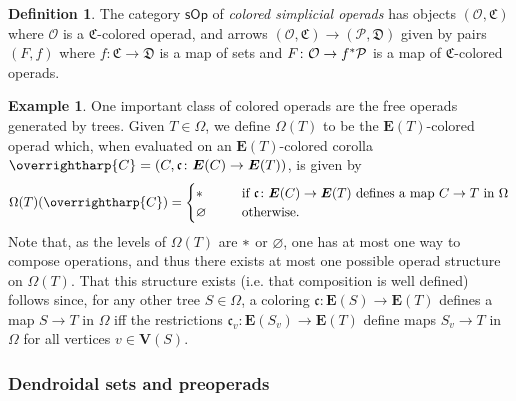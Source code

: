 \documentclass[a4paper,10pt
,draft
]{article}%
\numberwithin{equation}{section}
\numberwithin{figure}{section}
\theoremstyle{definition} %
\newtheorem{definition}[equation]{Definition}%
\newtheorem{example}[equation]{Example}%
\newcommand{\vect}[1]{\text{\overrightharp{\ensuremath{#1}}}}
\newcommand{\sOp}{\ensuremath{\mathsf{sOp}}}%
\renewcommand{\O}{\ensuremath{\mathcal O}}
\renewcommand{\P}{\ensuremath{\mathcal P}}
\newcommand{\1}{\ensuremath{\mathbbm 1}}%
\begin{document}
\begin{definition}
        The category $\sOp$ of \textit{colored simplicial operads}
        has objects $(\O, \mathfrak C)$ where $\O$ is a $\mathfrak C$-colored operad,
        and arrows $(\O, \mathfrak C) \to (\P, \mathfrak D)$ given by pairs $(F,f)$
        where $f \colon \mathfrak C \to \mathfrak D$ is a map of sets and
        $F \colon \O \to f^{\**}\P$ is a map of $\mathfrak C$-colored operads.
\end{definition}


\begin{example}
        One important class of colored operads are the free operads generated by trees.
        Given $T \in \Omega$, we define $\Omega(T)$ to be the $\boldsymbol{E}(T)$-colored operad which,
        when evaluated on an $\boldsymbol{E}(T)$-colored corolla
        $\vect C = (C, \mathfrak c \colon \boldsymbol{E}(C) \to \boldsymbol{E}(T))$, is given by
        \begin{equation}\label{OMEGADEF_EQ}
                \Omega(T)(\vect C) =
                \begin{cases}
                        \** \qquad & 
                        \mbox{if
                          $\mathfrak{c} \colon \boldsymbol{E}(C) \to \boldsymbol{E}(T)$
                          defines a map $C \to T$ in $\Omega$}
                        \\
                        \varnothing & \text{otherwise.}
                \end{cases}
        \end{equation}
        Note that, as the levels of $\Omega(T)$ are $\**$ or $\varnothing$,
        one has at most one way to compose operations,
        and thus there exists at most one possible operad structure on $\Omega(T)$.
        That this structure exists
        (i.e. that composition is well defined)
        follows since,
        for any other tree $S \in \Omega$,
        a coloring
        $\mathfrak{c} \colon \boldsymbol{E}(S) \to \boldsymbol{E}(T)$
        defines a map
        $S \to T$ in $\Omega$
        iff
        the restrictions
        $\mathfrak{c}_v \colon \boldsymbol{E}(S_v) \to \boldsymbol{E}(T)$
        define maps
        $S_v \to T$ in $\Omega$
        for all vertices $v \in \boldsymbol{V}(S)$.
\end{example}


\subsubsection*{Dendroidal sets and preoperads}
\end{document}
